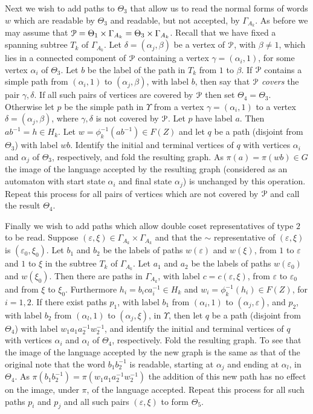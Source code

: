 \documentclass[a4paper,12pt]{article}
\renewcommand{\a}{\alpha }
\renewcommand{\b}{\beta }
\newcommand{\G}{\Gamma }
\newcommand{\g}{\gamma }
\renewcommand{\d}{\delta }
\newcommand{\e}{\varepsilon }
\newcommand{\T}{\Theta }
\newcommand{\U}{\Upsilon }
\newcommand{\cP}{{\cal{P}}}
\numberwithin{equation}{section}
\numberwithin{figure}{section}
\begin{document}
Next we wish to add paths to $\T_3$ that allow us to read the normal
forms of words $w$ which are readable by $\T_3$ and readable,
but not accepted, by $\G_{A_k}$.
As before we may assume that
$\cP=\T_1\times \G_{A_k}=
 \T_3\times \G_{A_k}$.
Recall that we have fixed a spanning subtree
$T_k$ of $\G_{A_k}$.
Let $\d=(\a_j,\b)$ be a vertex of $\cP$, with $\b\neq 1$, which lies
in a connected component of $\cP$ containing a vertex  $\g=(\a_i,1)$,
for some vertex $\a_i$ of $\T_3$.
Let $b$ be the label of the path in $T_k$ from $1$ to $\b$.
 If $\cP$ contains a simple
path from $(\a_i,1)$ to $(\a_j,\b)$, with label $b$,  then
 say that $\cP$ {\em covers} the pair $\g,\d$.
If all such pairs of vertices are covered by $\cP$ then set $\T_4=\T_3$.
Otherwise
let $p$ be the simple path in $\U$ from a
vertex $\g=(\a_i,1)$ to a vertex $\d=(\a_j,\b)$, where $\g,\d$
is not covered by $\cP$.
 Let
$p$ have label $a$.
Then $ab^{-1}=h\in H_k$. Let
$w=\phi_{k}^{-1}(ab^{-1})
\in F(Z)$ and let $q$ be a path (disjoint from $\T_3$)
with label $wb$. Identify the initial
and terminal vertices of $q$ with vertices $\a_i$ and $\a_j$ of $\T_3$,
respectively, and fold
the resulting graph.
As $\pi(a)=\pi(wb)\in G$ the image of the language accepted by
the resulting graph (considered as an automaton with start state  $\a_i$
 and final
state $\a_j$) is unchanged by
this operation.
Repeat this process for all pairs of  vertices which are not
covered by $\cP$ and
call the result $\T_4$.

Finally we wish to add paths which allow double coset representatives
of type $2$ to be read. Suppose $(\e,\xi)\in \G_{A_k}\times \G_{A_k}$ and
that the $\sim$ representative of $(\e,\xi)$ is $(\e_0,\xi_0)$.
Let $b_1$ and $b_2$ be the labels
of paths $w(\e)$ and $w(\xi)$, from $1$ to $\e$ and $1$ to $\xi$ in the
subtree $T_k$ of $\G_{A_k}$. Let $a_1$ and $a_2$ be the labels of
paths $w(\e_0)$ and $w(\xi_0)$. Then there are  paths in $\G_{A_k}$,
with label
$c=c(\e,\xi)$, from $\e$ to $\e_0$ and from $\xi$ to $\xi_0$.
Furthermore $h_i=
b_ica_i^{-1}\in H_k$ and $w_i=\phi_k^{-1}(h_i)\in F(Z)$, for $i=1,2$.
If there
exist paths $p_1$, with label $b_1$ from $(\a_i,1)$ to $(\a_j,\e)$,
and $p_2$, with label $b_2$ from
$(\a_l,1)$ to $(\a_j,\xi)$, in $\U$,  then
let $q$ be a path (disjoint from $\T_4$)
with label $w_1 a_1a_2^{-1} w_2^{-1}$,
and identify the initial
and terminal vertices of $q$ with  vertices $\a_i$ and $\a_l$
of $\T_4$, respectively.
Fold the resulting graph.
To see that the image of the language accepted by
 the new graph is the same as that of the original note
that the word $b_1b_2^{-1}$ is readable, starting at $\a_j$ and
ending at $\a_l$, in $\T_4$. As $\pi(b_1b_2^{-1})=\pi(w_1a_1a_2^{-1}w_2^{-1})$
the addition of this new path has no effect on the image, under $\pi$, of
the language accepted.
Repeat this process for all such paths $p_i$ and $p_j$ and all such
pairs $(\e,\xi)$ to form $\T_5$.
\end{document}
